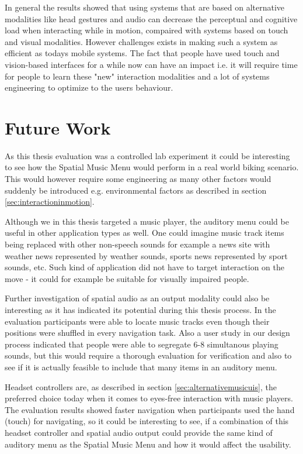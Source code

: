 In general the results showed that using systems that are based on alternative modalities like head gestures and audio can decrease the perceptual and cognitive load when interacting while in motion, compaired with systems based on touch and visual modalities. However challenges exists in making such a system as efficient as todays mobile systems. The fact that people have used touch and vision-based interfaces for a while now can have an impact i.e. it will require time for people to learn these "new" interaction modalities and a lot of systems engineering to optimize to the users behaviour.


\section{Future Work}
As this thesis evaluation was a controlled lab experiment it could be interesting to see how the Spatial Music Menu would perform in a real world biking scenario. This would however require some engineering as many other factors would suddenly be introduced e.g. environmental factors as described in section \ref{sec:interactioninmotion}.

Although we in this thesis targeted a music player, the auditory menu could be useful in other application types as well. One could imagine music track items being replaced with other non-speech sounds for example a news site with weather news represented by weather sounds, sports news represented by sport sounds, etc. Such kind of application did not have to target interaction on the move - it could for example be suitable for visually impaired people.

Further investigation of spatial audio as an output modality could also be interesting as it has indicated its potential during this thesis process. In the evaluation participants were able to locate music tracks even though their positions were shuffled in every navigation task. Also a user study in our design process indicated that people were able to segregate 6-8 simultanous playing sounds, but this would require a thorough evaluation for verification and also to see if it is actually feasible to include that many items in an auditory menu.

Headset controllers are, as described in section \ref{sec:alternativemusicuis}, the preferred choice today when it comes to eyes-free interaction with music players. The evaluation results showed faster navigation when participants used the hand (touch) for navigating, so it could be interesting to see, if a combination of this headset controller and spatial audio output could provide the same kind of auditory menu as the Spatial Music Menu and how it would affect the usability.






